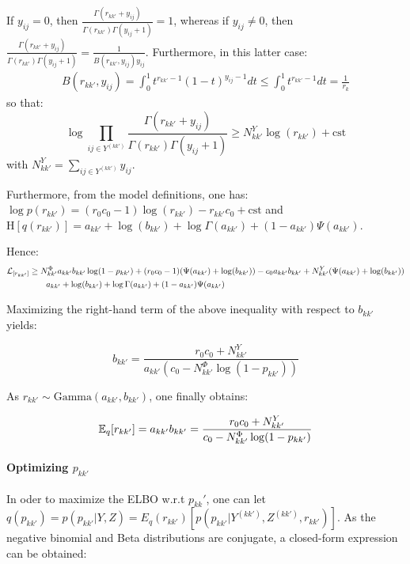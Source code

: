 If $y_{ij} = 0$, then $\frac{\Gamma(r_{kk'}+y_{ij})}{\Gamma(r_{kk'}) \Gamma(y_{ij}+1)} = 1$, whereas if $y_{ij} \ne 0$, then $\frac{\Gamma(r_{kk'}+y_{ij})}{\Gamma(r_{kk'}) \Gamma(y_{ij}+1)} = \frac{1}{B(r_{kk'}, y_{ij})y_{ij}}$. Furthermore, in this latter case:
%
\begin{align*}
B(r_{kk'}, y_{ij}) = \int_0^1 t^{r_{kk'}-1} (1-t)^{y_{ij}-1} dt  \leq \int_0^1 t^{r_{kk'}-1} dt = \frac{1}{r_k}
\end{align*}
%
so that:
%
\begin{equation*}
\log \prod_{ij\in Y^{(kk')}} \frac{\Gamma(r_{kk'}+y_{ij})}{\Gamma(r_{kk'}) \Gamma(y_{ij}+1) } \geq N^Y_{kk'} \log(r_{kk'}) + \mathrm{cst}
\end{equation*}
%
with $N^Y_{kk'} = \sum_{ij\in Y^{(kk')}} y_{ij}$.

Furthermore, from the model definitions, one has: $\log p(r_{kk'}) = (r_0 c_0-1)\log(r_{kk'}) - r_{kk'} c_0 + \mathrm{cst}$  and $\textrm{H}[q(r_{kk'})] = a_{kk'} + \log(b_{kk'}) +\log \Gamma(a_{kk'}) + (1-a_{kk'})\Psi(a_{kk'})$.

Hence:
%
\begin{align*}
\mathcal{L}_{[r_{kk'}]} &\geq N^\Phi_{kk'} a_{kk'} b_{kk'} \log(1-p_{kk'}) + (r_0 c_0-1 )(\Psi(a_{kk'}) + \log(b_{kk'})) -c_0 a_{kk'} b_{kk'} +N^Y_{kk'} (\Psi(a_{kk'}) + \log(b_{kk'}))  \\
&\qquad a_{kk'} + \log(b_{kk'}) +\log \Gamma(a_{kk'}) + (1-a_{kk'})\Psi(a_{kk'})
\end{align*}

Maximizing the right-hand term of the above inequality with respect to $b_{kk'}$ yields:

\begin{equation} \label{eq:update2}
b_{kk'} = \frac{r_0 c_0 + N^Y_{kk'}}{a_{kk'} (c_0 - N^\Phi_{kk'} \log(1-p_{kk'}))} \nonumber
\end{equation}

As $r_{kk'} \sim \textrm{Gamma}(a_{kk'},b_{kk'})$, one finally obtains:

\begin{equation}
\mathbb{E}_q[r_{kk'}] = a_{kk'} b_{kk'} = \frac{r_0 c_0 + N^Y_{kk'}}{c_0 - N^\Phi_{kk'} \log(1-p_{kk'})} \nonumber
\end{equation}

\paragraph{Optimizing $p_{kk'}$}

In oder to maximize the ELBO w.r.t $p_{kk}'$, one can let $q(p_{kk'}) = p(p_{kk'} | Y,Z) = E_q(r_{kk'}) [ p(p_{kk'} | Y^{(kk')},Z^{(kk')} ,r_{kk'})]$. As the negative binomial and Beta distributions are conjugate, a closed-form expression can be obtained:

